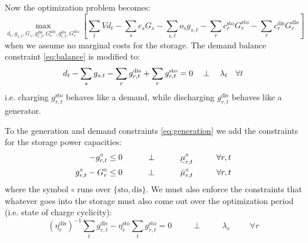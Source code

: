 \documentclass[final,3p]{elsarticle}
\def\l{\lambda} \def\K{\kappa} \def\m{\mu} \def\G{\Gamma} \def\d{\partial}
\begin{document}
Now the optimization problem becomes:
\begin{equation}
  \max_{d_{t}, g_{s,t}, G_s,g^{\textrm{dis}}_{r,t},G^{\textrm{dis}}_{r},g^{\textrm{sto}}_{r,t},G^{\textrm{sto}}_{r}}\left[\sum_{t} Vd_{t} -  \sum_s c_s G_s - \sum_{s,t} o_{s} g_{s,t} -\sum_r c^{\textrm{sto}}_r G^{\textrm{sto}}_r -\sum_r c^{\textrm{dis}}_r G^{\textrm{dis}}_r\right]  \label{eq:objsr}
\end{equation}
when we assume no marginal costs for the storage. The demand balance constraint \eqref{eq:balance} is modified to:
\begin{align}
  d_{t} - \sum_s g_{s,t} - \sum_r g^{\textrm{dis}}_{r,t} + \sum_r g^{\textrm{sto}}_{r,t}  =  0 \hspace{0.34cm}\perp \hspace{0.34cm} \l_t \hspace{0.34cm} \forall t \label{eq:balance3}
\end{align}
i.e. charging $g^{\textrm{sto}}_{r,t}$ behaves like a demand, while discharging
$g^{\textrm{dis}}_{r,t}$ behaves like a generator.

To the generation and demand constraints \eqref{eq:generation} we add the
constraints for the storage power capacities:
\begin{align}
  -g^\circ_{r,t}\leq 0 \hspace{1cm}\perp \hspace{1cm} \ubar{\mu}^\circ_{r,t} \hspace{1cm} \forall r,t  \label{eq:storlower2} \\
  g^\circ_{r,t} - G^\circ_r \leq 0 \hspace{1cm}\perp \hspace{1cm} \bar{\mu}^\circ_{r,t} \hspace{1cm} \forall r,t \label{eq:storupper2}
\end{align}
where the symbol $\circ$ runs over $\{\textrm{sto},\textrm{dis}\}$.
We must also enforce the constraints that whatever goes into the storage must
also come out over the optimization period (i.e. state of charge cyclicity):
\begin{equation}
  (\eta_r^{\textrm{dis}})^{-1} \sum_t g^{\textrm{dis}}_{r,t} - \eta_r^{\textrm{sto}}  \sum_t g^{\textrm{sto}}_{r,t}  = 0  \hspace{1cm}\perp \hspace{1cm} \lambda_{r} \hspace{1cm} \forall r \label{eq:storconstraint}
\end{equation}
\end{document}
